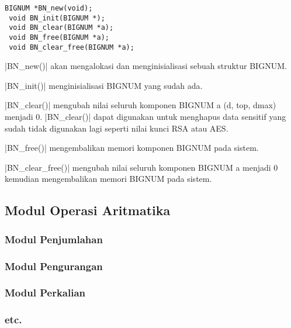 \begin{lstlisting}[caption=Primitif BIGNUM]
 BIGNUM *BN_new(void);
 void BN_init(BIGNUM *);
 void BN_clear(BIGNUM *a);
 void BN_free(BIGNUM *a);
 void BN_clear_free(BIGNUM *a);
\end{lstlisting}

|BN_new()| akan mengalokasi dan menginisialisasi sebuah struktur BIGNUM.

|BN_init()| menginisialisasi BIGNUM yang sudah ada.

|BN_clear()| mengubah nilai seluruh komponen BIGNUM a (d, top, dmax) menjadi 0. |BN_clear()| dapat digunakan untuk menghapus data sensitif yang sudah tidak digunakan lagi seperti nilai kunci RSA atau AES.

|BN_free()| mengembalikan memori komponen BIGNUM pada sistem.

|BN_clear_free()| mengubah nilai seluruh komponen BIGNUM a menjadi 0 kemudian mengembalikan memori BIGNUM pada sistem.


\subsection{Modul Operasi Aritmatika}
\subsubsection{Modul Penjumlahan}
\subsubsection{Modul Pengurangan}
\subsubsection{Modul Perkalian}
\subsubsection{etc.}
